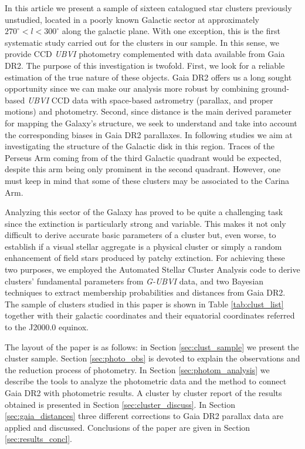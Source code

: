 \documentclass[draft]{aa}
\begin{document}
In this article we present a sample of sixteen catalogued star clusters
\citep{Dias_2002} previously unstudied, located in a poorly known Galactic sector
at approximately $270^\circ<l<300^\circ$ along the galactic plane.
With one exception, this is
the first systematic study carried out for the clusters in our sample. In this
sense, we provide CCD \textit{UBVI} photometry complemented with data available
from Gaia DR2. The purpose of this investigation is twofold. First, we look
for a reliable estimation of the true nature of these objects. Gaia DR2 offers
us a long sought opportunity since we can make our analysis more robust by
combining  ground-based \textit{UBVI} CCD data with space-based astrometry 
(parallax, and proper motions) and photometry. Second, since distance is the
main derived parameter for mapping the Galaxy’s structure, we seek to
understand and take
into account the corresponding biases in Gaia DR2 parallaxes.
In following studies we aim at investigating the structure of the
Galactic disk in this region. Traces of the Perseus Arm coming from of the
third Galactic quadrant  would be expected, despite this arm being only
prominent in the second quadrant. However, one must keep in mind 
that some of these clusters may be associated to the Carina Arm.

Analyzing this sector of the Galaxy has proved to be quite a challenging
task since the extinction is particularly strong and variable. This
makes it not only difficult to derive accurate basic parameters of a cluster
but, even worse, to establish if a visual stellar aggregate is a physical
cluster or simply a random enhancement of field stars produced by patchy
extinction. 
%
For achieving these two purposes, we employed the Automated Stellar
Cluster Analysis code \citep[\texttt{ASteCA};][]{Perren_2015} to derive
clusters' fundamental parameters from \textit{G-UBVI} data, and two Bayesian
techniques to extract membership probabilities and distances from Gaia DR2. The
sample of clusters studied in this paper is shown in Table 
\ref{tab:clust_list} together with their galactic coordinates and their
equatorial coordinates referred to the J2000.0 equinox.

The layout of the paper is as follows: in Section \ref{sec:clust_sample} we
present the cluster sample.
Section \ref{sec:photo_obs} is devoted to explain the observations and the
reduction process of photometry. In Section \ref{sec:photom_analysis} we
describe the tools to analyze the photometric data and the method to connect
Gaia DR2 with photometric results. A cluster by cluster report of the results
obtained is presented in Section \ref{sec:cluster_discuss}. In Section
\ref{sec:gaia_distances} three different corrections to Gaia DR2 parallax
data are applied and discussed. Conclusions of the paper are given in Section 
\ref{sec:results_concl}.
\end{document}
